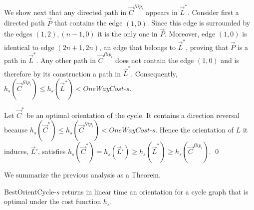 	We show next that any directed path in $\vec{C}^{flip_i}$ appears in $\vec{L}^*$. Consider first a directed path $\vec{P}$ that contains the edge $(1,0)$. 
	Since this edge is surrounded by the edges $(1,2), (n-1,0)$ it is the only one in $\vec{P}$. Moreover, edge $(1,0)$ is identical to edge $(2n+1,2n)$, an edge that belongs to 
	$\vec{L}^*$, proving that  $\vec{P}$ is a path in $\vec{L}^*$.
	Any other path in $\vec{C}^{flip_i}$ does not contain the edge $(1,0)$ and is therefore by its construction a path in $\vec{L}^*$. 
	Consequently, $h_s(\vec{C}^{flip_i})\leq h_s(\vec{L}^*)<\textit{OneWayCost-s}$.
	
	Let $\vec{C}^*$ be an optimal orientation of the cycle. It contains a direction reversal
	because $h_s(\vec{C}^*)\leq h_s(\vec{C}^{flip_i})<\textit{OneWayCost-s}$.
	Hence the orientation of $L$ it induces, $\vec{L}'$, satisfies
	$h_s(\vec{C}^*)=h_s(\vec{L}')\geq h_s(\vec{L}^*)\geq h_s(\vec{C}^{flip_i})$.
\qed

We summarize the previous analysis as a Theorem.
\begin{theorem}
	BestOrientCycle-$s$  returns  in linear time an orientation for a cycle graph that is optimal under the cost function $h_s$.
\end{theorem}

